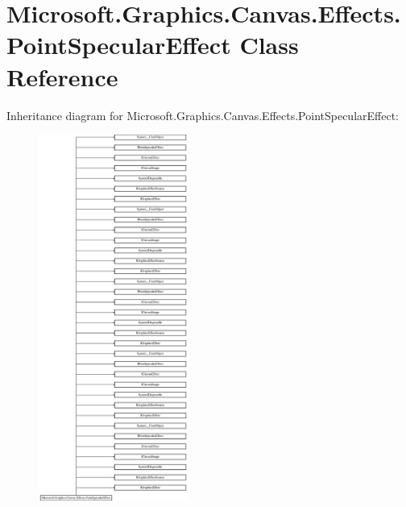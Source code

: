 \hypertarget{class_microsoft_1_1_graphics_1_1_canvas_1_1_effects_1_1_point_specular_effect}{}\section{Microsoft.\+Graphics.\+Canvas.\+Effects.\+Point\+Specular\+Effect Class Reference}
\label{class_microsoft_1_1_graphics_1_1_canvas_1_1_effects_1_1_point_specular_effect}
Inheritance diagram for Microsoft.\+Graphics.\+Canvas.\+Effects.\+Point\+Specular\+Effect\+:\begin{figure}[H]
\begin{center}
\leavevmode
\includegraphics[height=12.000000cm]{class_microsoft_1_1_graphics_1_1_canvas_1_1_effects_1_1_point_specular_effect}
\end{center}
\end{figure}
